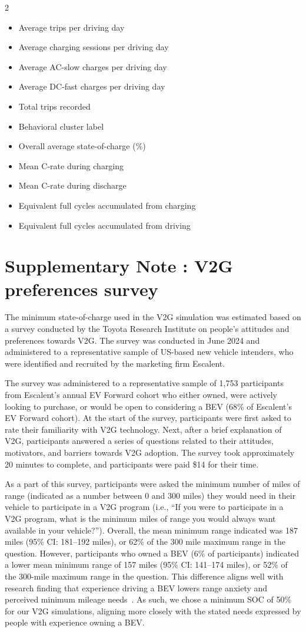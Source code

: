 \documentclass[pdflatex,sn-nature]{sn-jnl}%
\theoremstyle{thmstyleone}%
\theoremstyle{thmstyletwo}%
\theoremstyle{thmstylethree}%
\newcounter{supnote}
\newcommand{\supnote}[1]{%
    \refstepcounter{supnote}%
    \section*{Supplementary Note \thesupnote: #1}%
    \addcontentsline{toc}{section}{Supplementary Note \thesupnote}%
}
\begin{document}
\begin{multicols}{2}
\begin{itemize}
    \item Average trips per driving day
    \item Average charging sessions per driving day
    \item Average AC-slow charges per driving day
    \item Average DC-fast charges per driving day
    \item Total trips recorded
    \item Behavioral cluster label
    \item Overall average state-of-charge (\%)
    \item Mean C-rate during charging
    \item Mean C-rate during discharge
    \item Equivalent full cycles accumulated from charging
    \item Equivalent full cycles accumulated from driving
\end{itemize}
\end{multicols}



\supnote{V2G preferences survey}
\label{sec: survey}

The minimum state-of-charge used in the V2G simulation was estimated based on a survey conducted by the Toyota Research Institute on people's attitudes and preferences towards V2G. The survey was conducted in June 2024 and administered to a representative sample of US-based new vehicle intenders, who were identified and recruited by the marketing firm Escalent.

The survey was administered to a representative sample of 1,753 participants from Escalent's annual EV Forward cohort who either owned, were actively looking to purchase, or would be open to considering a BEV (68\% of Escalent's EV Forward cohort). At the start of the survey, participants were first asked to rate their familiarity with V2G technology. Next, after a brief explanation of V2G, participants answered a series of questions related to their attitudes, motivators, and barriers towards V2G adoption. The survey took approximately 20 minutes to complete, and participants were paid \$14 for their time.

As a part of this survey, participants were asked the minimum number of miles of range (indicated as a number between 0 and 300 miles) they would need in their vehicle to participate in a V2G program (i.e., ``If you were to participate in a V2G program, what is the minimum miles of range you would always want available in your vehicle?''). Overall, the mean minimum range indicated was 187 miles (95\% CI: 181--192 miles), or 62\% of the 300 mile maximum range in the question. However, participants who owned a BEV (6\% of participants) indicated a lower mean minimum range of 157 miles (95\% CI: 141--174 miles), or 52\% of the 300-mile maximum range in the question. This difference aligns well with research finding that experience driving a BEV lowers range anxiety and perceived minimum mileage needs~\cite{rauh2015understanding, ma2025range}. As such, we chose a minimum SOC of 50\% for our V2G simulations, aligning more closely with the stated needs expressed by people with experience owning a BEV.
\end{document}
